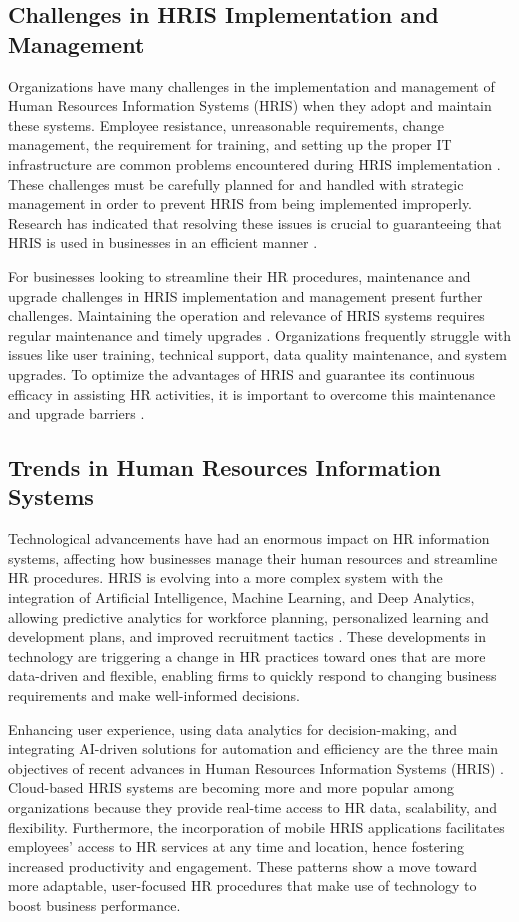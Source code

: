     \subsection{Challenges in HRIS Implementation and Management}
        Organizations have many challenges in the implementation and management of Human Resources Information Systems (HRIS) when they adopt and maintain these systems. Employee resistance, unreasonable requirements, change management, the requirement for training, and setting up the proper IT infrastructure are common problems encountered during HRIS implementation \cite{kben12022}. These challenges must be carefully planned for and handled with strategic management in order to prevent HRIS from being implemented improperly. Research has indicated that resolving these issues is crucial to guaranteeing that HRIS is used in businesses in an efficient manner \cite{arc12020}.
        
        For businesses looking to streamline their HR procedures, maintenance and upgrade challenges in HRIS implementation and management present further challenges. Maintaining the operation and relevance of HRIS systems requires regular maintenance and timely upgrades \cite{ecaj12021}. Organizations frequently struggle with issues like user training, technical support, data quality maintenance, and system upgrades. To optimize the advantages of HRIS and guarantee its continuous efficacy in assisting HR activities, it is important to overcome this maintenance and upgrade barriers \cite{m12024}.

    \subsection{Trends in Human Resources Information Systems}
        Technological advancements have had an enormous impact on HR information systems, affecting how businesses manage their human resources and streamline HR procedures. HRIS is evolving into a more complex system with the integration of Artificial Intelligence, Machine Learning, and Deep Analytics, allowing predictive analytics for workforce planning, personalized learning and development plans, and improved recruitment tactics \cite{p12024}. These developments in technology are triggering a change in HR practices toward ones that are more data-driven and flexible, enabling firms to quickly respond to changing business requirements and make well-informed decisions.

        Enhancing user experience, using data analytics for decision-making, and integrating AI-driven solutions for automation and efficiency are the three main objectives of recent advances in Human Resources Information Systems (HRIS) \cite{s22024}. Cloud-based HRIS systems are becoming more and more popular among organizations because they provide real-time access to HR data, scalability, and flexibility. Furthermore, the incorporation of mobile HRIS applications facilitates employees' access to HR services at any time and location, hence fostering increased productivity and engagement. These patterns show a move toward more adaptable, user-focused HR procedures that make use of technology to boost business performance.
    
